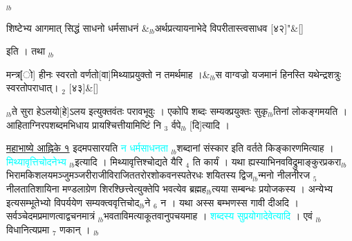 \documentclass[article,12pt,a4paper]{memoir}%
\newcommand{\quotelemma}[1]{\textcolor{cyan}{#1}}
\newcounter{parCount}
\begin{document}
	{}
	\pend%
      {\tiny $_{lb}$}

	  
	  \pstart \leavevmode%
	\hphantom{.}
	    \pend%
	  
	    
	    \stanza[\smallbreak]
	  शिष्टेभ्य आगमात् सिद्धं साधनो धर्मसाधनं &{\tiny $_{lb}$}अर्थप्रत्यायनाभेदे विपरीतास्त्वसाधव [४२]{\normalfontlatin\large\qquad{}"}\&[\smallbreak]
	  
	  
	  
	    \pstart  \leavevmode%
	    \hphantom{.}
	   इति । तथा
	{}
	\pend%
      {\tiny $_{lb}$}
	  \bigskip
	  \begingroup
	

	  
	  \pstart \leavevmode%
	\hphantom{.}
	    \pend%
	  
	    
	    \stanza[\smallbreak]
	  मन्त्र[ो] हीनः स्वरतो वर्णतो[वा]मिथ्याप्रयुक्तो न तमर्थमाह ।&{\tiny $_{lb}$}स वाग्वज्रो यजमानं हिनस्ति यथेन्द्रशत्रुः स्वरतोपराधात्। {\tiny $_{2}$} [४३]\&[\smallbreak]
	  
	  
	  
	    \pstart  \leavevmode%
	    \hphantom{.}
	   {\tiny $_{lb}$}ते सुरा हेऽलयो[हे]ऽलय इत्युक्तवंतः परावभूवुः । एकोपि शब्दः सम्यक्प्रयुक्तः सुकृ{\tiny $_{lb}$}तिनां लोकङ्गमयति । आहिताग्निरपशब्दमभिधाय प्रायश्चित्तीयामिष्टिं नि {\tiny $_{3}$} र्वपे{\tiny $_{lb}$} [दि]त्यादि ।
	{}
	\pend%
      
	  \endgroup
	

	  
	  \pstart \leavevmode%
	\href{http://sarit.indology.info/?cref=MaBh\%C4\%81.1}{महाभाष्ये आह्निके १} इदमपसारयति \quotelemma{न धर्मसाधनता} \cite[14b9]{vn-msN} {\tiny $_{lb}$}शब्दानां संस्कार इति वर्तते किङ्कारणमित्याह । \quotelemma{मिथ्यावृत्तिचोदनेभ्य} \cite[14b9]{vn-msN} {\tiny $_{lb}$}इत्यादि । मिथ्यावृत्तिश्चोद्यते यैरि {\tiny $_{4}$} ति कार्यं । यथा ह्यस्याभिनवविद्रुमाङ्कुरप्रकरा{\tiny $_{lb}$}भिरामकिशलयमञ्जुमञ्जरीराजीविराजिततरोरशोकवनस्पतेरधः शयितस्य द्विज{\tiny $_{lb}$}न्मनो नीलनीरज {\tiny $_{5}$} नीलतातिशायिना मण्डलाग्रेण शिरश्छित्त्वेत्युक्तेपि भवत्येव ब्रह्मह{\tiny $_{lb}$}त्यया सम्बन्धः प्रयोजकस्य । अन्येभ्य इत्यसम्भूतेभ्यो विपर्ययेण सम्यक्त्ववृत्तिचोद{\tiny $_{lb}$}ने {\tiny $_{6}$} न । यथा अस्स बम्भणस्स गावी दीअदि । सर्वञ्चेदमप्रमाणत्वाद्वचनमात्रं {\tiny $_{lb}$}भवताविमत्याकूतवानुपचयमाह । \quotelemma{शब्दस्य सुप्रयोगादेवेत्यादि} \cite[14b9]{vn-msN} । एवं {\tiny $_{lb}$}विधानित्यप्रमा {\tiny $_{7}$} णकान् ।
	{}
	\pend%
      {\tiny $_{lb}$}
\end{document}
